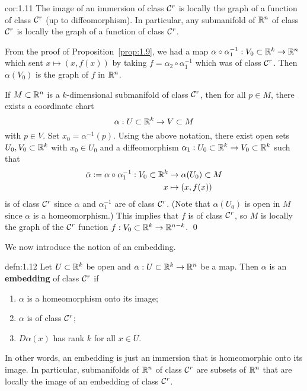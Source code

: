 \begin{cor}{cor:1.11}
    The image of an immersion of class ${\cal C}^r$ is locally the graph of a 
    function of class ${\cal C}^r$ (up to diffeomorphism). In particular, 
    any submanifold of $\mathbb{R}^n$ of class ${\cal C}^r$ is locally the graph of a 
    function of class ${\cal C}^r$.
\end{cor}\vspace{-0.25cm} \newpage
\begin{pf}
    From the proof of Proposition~\ref{prop:1.9}, we had a map
    $\alpha \circ \alpha_1^{-1} : V_0 \subset \mathbb{R}^k \to \mathbb{R}^n$ which sent 
    $x \mapsto (x, f(x))$ by taking $f = \alpha_2 \circ \alpha_1^{-1}$ which 
    was of class ${\cal C}^r$. Then $\alpha(V_0)$ is the graph of $f$ in $\mathbb{R}^n$. 
    
    If $M \subset \mathbb{R}^n$ is a $k$-dimensional submanifold of class ${\cal C}^r$, 
    then for all $p \in M$, there exists a coordinate chart 
    \[ \alpha : U \subset \mathbb{R}^k \to V \subset M \] 
    with $p \in V$. Set $x_0 = \alpha^{-1}(p)$. Using the above notation, 
    there exist open sets $U_0, V_0 \subset \mathbb{R}^k$ with $x_0 \in U_0$ 
    and a diffeomorphism $\alpha_1 : U_0 \subset \mathbb{R}^k \to V_0 \subset \mathbb{R}^k$ 
    such that 
    \begin{align*} 
        \tilde\alpha := \alpha \circ \alpha_1^{-1} : V_0 \subset \mathbb{R}^k 
        &\to \alpha(U_0) \subset M \\ 
        x &\mapsto (x, f(x)) 
    \end{align*}
    is of class ${\cal C}^r$ since $\alpha$ and $\alpha_1^{-1}$ are of 
    class ${\cal C}^r$. (Note that $\alpha(U_0)$ is open in $M$ since $\alpha$ 
    is a homeomorphism.) This implies that $f$ is of class ${\cal C}^r$, so $M$ 
    is locally the graph of the ${\cal C}^r$ function $f : V_0 \subset \mathbb{R}^k \to \mathbb{R}^{n-k}$. \qed 
\end{pf}\vspace{-0.25cm}

We now introduce the notion of an embedding.
\begin{defn}{defn:1.12}
    Let $U \subset \mathbb{R}^k$ be open and $\alpha : U \subset \mathbb{R}^k \to \mathbb{R}^n$ 
    be a map. Then $\alpha$ is an {\bf embedding} of class ${\cal C}^r$ if 
    \begin{enumerate}[(1)]
        \item $\alpha$ is a homeomorphism onto its image; 
        \item $\alpha$ is of class ${\cal C}^r$; 
        \item $D\alpha(x)$ has rank $k$ for all $x \in U$. 
    \end{enumerate}
\end{defn}\vspace{-0.25cm}
In other words, an embedding is just an immersion that is homeomorphic onto 
its image. In particular, submanifolds of $\mathbb{R}^n$ of class ${\cal C}^r$ are subsets 
of $\mathbb{R}^n$ that are locally the image of an embedding of class ${\cal C}^r$. 

